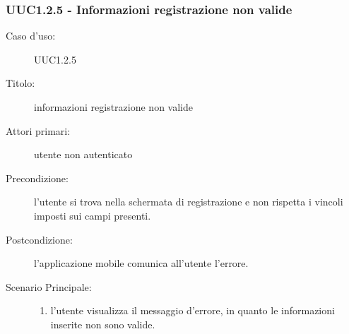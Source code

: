 \documentclass[components/casi-duso-app]{subfiles}
\begin{document}
\subsubsection{UUC1.2.5 - Informazioni registrazione non valide}%
\label{subsub:UUC1.2.5utente}
\begin{description}
  \item[Caso d’uso:] UUC1.2.5
  \item[Titolo:] informazioni registrazione non valide
  \item[Attori primari:] utente non autenticato
  \item[Precondizione:] l'utente si trova nella schermata di registrazione e non rispetta i vincoli imposti sui campi presenti.
  \item[Postcondizione:] l'applicazione mobile comunica all'utente l'errore.
  \item[Scenario Principale:]
        \begin{enumerate}
          \item l'utente visualizza il messaggio d'errore, in quanto le informazioni inserite non sono valide.
        \end{enumerate}
\end{description}

\end{document}
